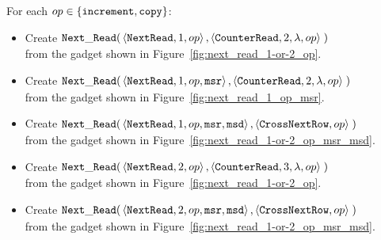 For each $op\in \{ {\tt increment}, {\tt copy} \}$:
\begin{itemize}

    \item Create
    $\begin{aligned}[t]
        {\tt Next\_Read}(& \left\langle {\tt NextRead},    1,          op \right\rangle,
                    \left\langle {\tt CounterRead}, 2, \lambda, op \right\rangle \;)
    \end{aligned}$\\from the gadget shown in Figure~\ref{fig:next_read_1-or-2_op}.

    \item Create
    $\begin{aligned}[t]
        {\tt Next\_Read}(& \left\langle {\tt NextRead},    1,          op, {\tt msr} \right\rangle,
                    \left\langle {\tt CounterRead}, 2, \lambda, op            \right\rangle \;)
    \end{aligned}$\\from the gadget shown in Figure~\ref{fig:next_read_1_op_msr}.

    \item Create
    $\begin{aligned}[t]
        {\tt Next\_Read}(& \left\langle {\tt NextRead}, 1,  op, {\tt msr}, {\tt msd} \right\rangle,
                    \left\langle {\tt CrossNextRow}, op                       \right\rangle \;)
    \end{aligned}$\\from the gadget shown in Figure~\ref{fig:next_read_1-or-2_op_msr_msd}.


    \item Create
    $\begin{aligned}[t]
        {\tt Next\_Read}(& \left\langle {\tt NextRead},    2,          op \right\rangle,
                    \left\langle {\tt CounterRead}, 3, \lambda, op \right\rangle \;)
    \end{aligned}$\\from the gadget shown in Figure~\ref{fig:next_read_1-or-2_op}.

    \item Create
    $\begin{aligned}[t]
        {\tt Next\_Read}(& \left\langle {\tt NextRead}, 2,  op, {\tt msr}, {\tt msd} \right\rangle,
                    \left\langle {\tt CrossNextRow}, op                       \right\rangle \;)
    \end{aligned}$\\from the gadget shown in Figure~\ref{fig:next_read_1-or-2_op_msr_msd}.



\end{itemize}

